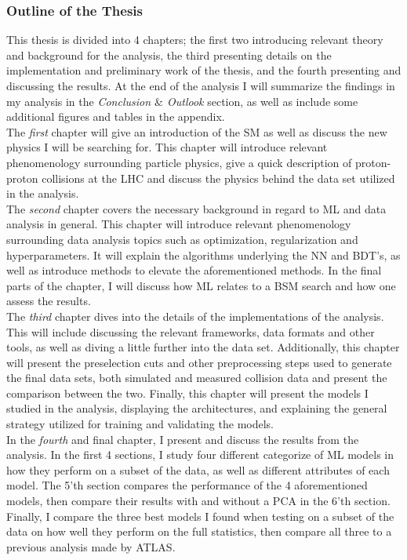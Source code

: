 \subsubsection*{Outline of the Thesis}
This thesis is divided into 4 chapters; the first two introducing relevant theory and background for the analysis, the third presenting 
details on the implementation and preliminary work of the thesis, and the fourth presenting and discussing the results. At the end of the analysis I will summarize 
the findings in my analysis in the \emph{Conclusion $\&$ Outlook} section, as well as include some additional figures and tables 
in the appendix. 
\\
The \emph{first} chapter will give an introduction of the \ac{SM} as well as discuss the new physics I will be searching for. This chapter will 
introduce relevant phenomenology surrounding particle physics, give a quick description of proton-proton collisions at the \ac{LHC} and discuss 
the physics behind the data set utilized in the analysis. 
\\
The \emph{second} chapter covers the necessary background in regard to \ac{ML} and data analysis in general. This chapter will introduce relevant phenomenology
surrounding data analysis topics such as optimization, regularization and hyperparameters. It will explain the algorithms underlying the \ac{NN} and 
\ac{BDT}'s, as well as introduce methods to elevate the aforementioned methods. In the final parts of the chapter, I will discuss how \ac{ML} relates to 
a \ac{BSM} search and how one assess the results.
\\
The \emph{third} chapter dives into the details of the implementations of the analysis. This will include discussing the relevant frameworks, data formats and 
other tools, as well as diving a little further into the data set. Additionally, this chapter will present the preselection cuts and other preprocessing steps
used to generate the final data sets, both simulated and measured collision data and present the comparison between the two. Finally, this chapter will present the 
models I studied in the analysis, displaying the architectures, and explaining the general strategy utilized for training and validating the models.
\\
In the \emph{fourth} and final chapter, I present and discuss the results from the analysis. In the first 4 sections, I study four different categorize of \ac{ML} models in how they 
perform on a subset of the data, as well as different attributes of each model. The 5'th section compares the performance of the 4 aforementioned models, then compare 
their results with and without a \ac{PCA} in the 6'th section. Finally, I compare the three best models I found when testing on a subset of the data on how well they perform 
on the full statistics, then compare all three to a previous analysis made by ATLAS.



